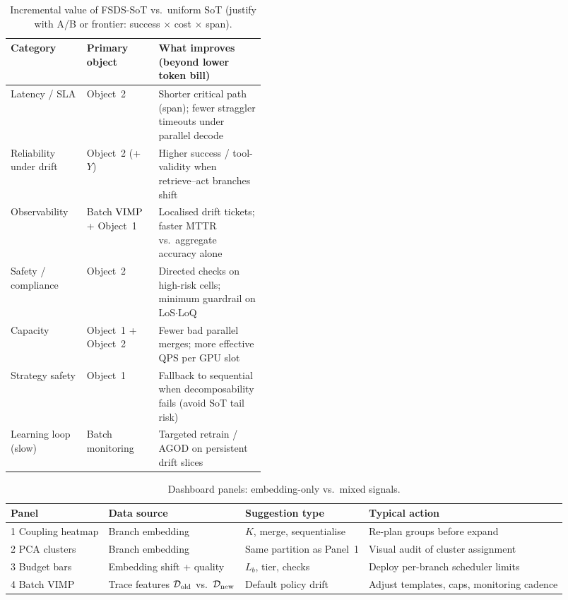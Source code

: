 \begin{table}[t]
\centering
\small
\caption{Incremental value of FSDS-SoT vs.\ uniform SoT (justify with A/B or
frontier: success $\times$ cost $\times$ span).}
\label{tab:incremental-value}
\begin{tabular}{@{}llp{0.42\linewidth}@{}}
\toprule
Category & Primary object & What improves (beyond lower token bill) \\
\midrule
Latency / SLA &
Object~2 &
Shorter critical path (span); fewer straggler timeouts under parallel decode \\
Reliability under drift &
Object~2 (+ $Y$) &
Higher success / tool-validity when retrieve--act branches shift \\
Observability &
Batch $\mathrm{VIMP}$ + Object~1 &
Localised drift tickets; faster MTTR vs.\ aggregate accuracy alone \\
Safety / compliance &
Object~2 &
Directed checks on high-risk cells; minimum guardrail on LoS$\cdot$LoQ \\
Capacity &
Object~1 + Object~2 &
Fewer bad parallel merges; more effective QPS per GPU slot \\
Strategy safety &
Object~1 &
Fallback to sequential when decomposability fails (avoid SoT tail risk) \\
Learning loop (slow) &
Batch monitoring &
Targeted retrain / AGOD on persistent drift slices \\
\bottomrule
\end{tabular}
\end{table}

\begin{table}[t]
\centering
\small
\caption{Dashboard panels: embedding-only vs.\ mixed signals.}
\label{tab:dashboard-panels}
\begin{tabular}{@{}llll@{}}
\toprule
Panel & Data source & Suggestion type & Typical action \\
\midrule
1 Coupling heatmap & Branch embedding & $K$, merge, sequentialise &
Re-plan groups before expand \\
2 PCA clusters & Branch embedding & Same partition as Panel~1 &
Visual audit of cluster assignment \\
3 Budget bars &
Embedding shift + quality &
$L_b$, tier, checks &
Deploy per-branch scheduler limits \\
4 Batch VIMP &
Trace features $\mathcal{D}_{\mathrm{old}}$ vs.\ $\mathcal{D}_{\mathrm{new}}$ &
Default policy drift &
Adjust templates, caps, monitoring cadence \\
\bottomrule
\end{tabular}
\end{table}

